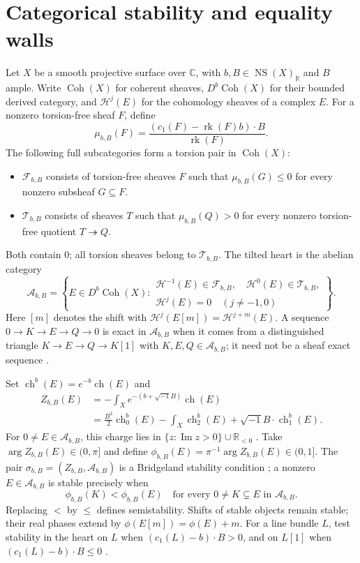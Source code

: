 \documentclass[12pt,reqno]{amsart}
\newcommand{\ii}{\sqrt{-1}}
\newcommand{\R}{\mathbb R}
\newcommand{\NS}{\operatorname{NS}}
\newcommand{\ch}{\operatorname{ch}}
\newcommand{\Coh}{\operatorname{Coh}}
\newcommand{\Ima}{\operatorname{Im}}
\begin{document}
\section{Categorical stability and equality walls}\label{sec:stability}
Let $X$ be a smooth projective surface over $\mathbb C$, with
$b,B\in\NS(X)_\R$ and $B$ ample. Write $\Coh(X)$ for coherent sheaves,
$D^b\Coh(X)$ for their bounded derived category, and $\mathcal H^j(E)$
for the cohomology sheaves of a complex $E$.
For a nonzero torsion-free sheaf $F$, define
\[
 \mu_{b,B}(F)=\frac{(c_1(F)-\operatorname{rk}(F)b)\cdot B}
 {\operatorname{rk}(F)}.
\]
The following full subcategories form a torsion pair in $\Coh(X)$:
\begin{itemize}
\item $\mathcal F_{b,B}$ consists of torsion-free sheaves $F$ such that
$\mu_{b,B}(G)\le0$ for every nonzero subsheaf $G\subseteq F$.
\item $\mathcal T_{b,B}$ consists of sheaves $T$ such that
$\mu_{b,B}(Q)>0$ for every nonzero torsion-free quotient $T\twoheadrightarrow Q$.
\end{itemize}
Both contain $0$; all torsion sheaves belong to $\mathcal T_{b,B}$.
The tilted heart is the abelian category
\[
 \mathcal A_{b,B}=\left\{E\in D^b\Coh(X):
 \begin{array}{l}
 \mathcal H^{-1}(E)\in\mathcal F_{b,B},\quad
 \mathcal H^0(E)\in\mathcal T_{b,B},\\
 \mathcal H^j(E)=0\quad(j\ne-1,0)
 \end{array}\right\}.
\]
Here $[m]$ denotes the shift with
$\mathcal H^j(E[m])=\mathcal H^{j+m}(E)$.
A sequence $0\to K\to E\to Q\to0$ is exact in $\mathcal A_{b,B}$
when it comes from a distinguished triangle $K\to E\to Q\to K[1]$
with $K,E,Q\in\mathcal A_{b,B}$; it need not be a sheaf exact sequence
\cite[Section 2]{AB}.

Set $\ch^b(E)=e^{-b}\ch(E)$ and
\[
 \begin{aligned}
 Z_{b,B}(E)&=-\int_Xe^{-(b+\ii B)}\ch(E)\\
 &=\frac{B^2}{2}\ch_0^b(E)-\int_X\ch_2^b(E)
   +\ii B\cdot\ch_1^b(E).
 \end{aligned}
\]
For $0\ne E\in\mathcal A_{b,B}$, this charge lies in
$\{z:\Ima z>0\}\cup\R_{<0}$ \cite[Corollary 2.1]{AB}.
Take $\arg Z_{b,B}(E)\in(0,\pi]$ and define
$\phi_{b,B}(E)=\pi^{-1}\arg Z_{b,B}(E)\in(0,1]$.
The pair $\sigma_{b,B}=(Z_{b,B},\mathcal A_{b,B})$ is a Bridgeland
stability condition \cite[Section 2]{AB}; a nonzero $E\in\mathcal A_{b,B}$
is stable precisely when
\[
 \phi_{b,B}(K)<\phi_{b,B}(E)
 \quad\text{for every }0\ne K\subsetneq E
 \text{ in }\mathcal A_{b,B}.
\]
Replacing $<$ by $\le$ defines semistability.
Shifts of stable objects remain stable; their real phases extend by
$\phi(E[m])=\phi(E)+m$.
For a line bundle $L$, test stability in the heart on $L$ when
$(c_1(L)-b)\cdot B>0$, and on $L[1]$ when
$(c_1(L)-b)\cdot B\le0$ \cite[Section 2.1]{Makela}.
\end{document}
